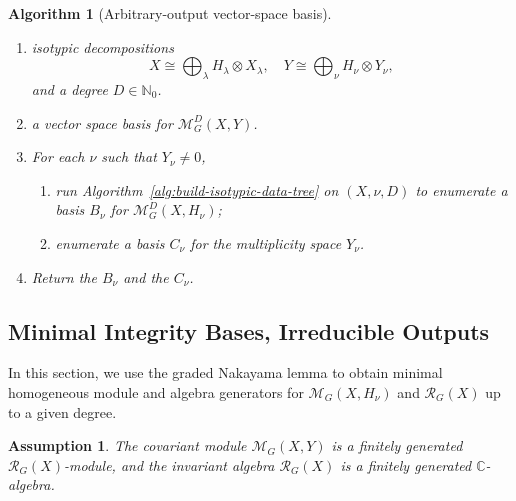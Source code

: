 \documentclass[11pt]{article}
\newcommand{\dsC}{\mathbb{C}}
\newcommand{\dsN}{\mathbb{N}}
\newcommand{\scM}{\mathcal{M}}
\newcommand{\scR}{\mathcal{R}}
\newtheorem{algorithm}[theorem]{Algorithm}
\newtheorem{assumption}{Assumption}[section]
\theoremstyle{definition}
\begin{document}
\begin{algorithm}[Arbitrary-output vector-space basis]\label{alg:arbitrary-output-vector-space-basis}

  \phantom{}

  \begin{enumerate}[label=\textbf{Step \arabic*.},leftmargin=2.8cm]

    \item[\textbf{Input:}] isotypic decompositions
    \[
      X\cong \bigoplus_\lambda H_\lambda\otimes X_\lambda,
      \quad
      Y\cong \bigoplus_\nu H_\nu\otimes Y_\nu,
    \]
    and a degree $D \in \dsN_0$.

    \item[\textbf{Output:}] a vector space basis for $\scM_G^D(X,Y)$.

    \item For each $\nu$ such that $Y_\nu\neq 0$,

    \begin{enumerate}
      \item run Algorithm~\ref{alg:build-isotypic-data-tree} on $(X,\nu,D)$ to enumerate a basis $B_\nu$ for $\scM_G^D(X,H_\nu)$;

      \item enumerate a basis $C_\nu$ for the multiplicity space $Y_\nu$.
    \end{enumerate}

    \item Return the $B_\nu$ and the $C_\nu$.
  \end{enumerate}
\end{algorithm}



\subsection{Minimal Integrity Bases, Irreducible Outputs}\label{sec:irreducible-generators}

In this section, we use the graded Nakayama lemma to obtain minimal homogeneous module and algebra generators for $\scM_G(X,H_\nu)$ and $\scR_G(X)$ up to a given degree.

\begin{assumption}\label{ass:finitely-generated}
  The covariant module $\scM_G(X,Y)$ is a finitely generated $\scR_G(X)$-module, and the invariant algebra $\scR_G(X)$ is a finitely generated $\dsC$-algebra.
\end{assumption}
\end{document}
